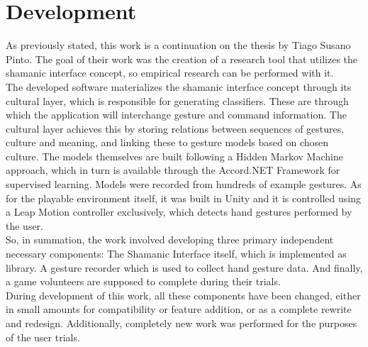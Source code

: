 \chapter{Development} \label{chap:develop}
    As previously stated, this work is a continuation on the thesis by Tiago Susano Pinto\cite{pinto2015}. The goal of their work was the creation of a research tool that utilizes the shamanic interface concept, so empirical research can be performed with it.\\ 
    The developed software materializes the shamanic interface concept through its cultural layer, which is responsible for generating classifiers. These are through which the application will interchange gesture and command information. The cultural layer achieves this by storing relations between sequences of gestures, culture and meaning, and linking these to gesture models based on chosen culture. The models themselves are built following a Hidden Markov Machine approach, which in turn is available through the Accord.NET Framework for supervised learning. Models were recorded from hundreds of example gestures. As for the playable environment itself, it was built in Unity and it is controlled using a Leap Motion controller exclusively, which detects hand gestures performed by the user.\\
    So, in summation, the work involved developing three primary independent necessary components: The Shamanic Interface itself, which is implemented as library. A gesture recorder which is used to collect hand gesture data. And finally, a game volunteers are supposed to complete during their trials.\\
    During development of this work, all these components have been changed, either in small amounts for compatibility or feature addition, or as a complete rewrite and redesign. Additionally, completely new work was performed for the purposes of the user trials.



